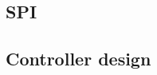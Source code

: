 \documentclass[../../main]{subfiles}
\begin{document}
\subsection{SPI}%
\label{sub:spi}



\subsection{Controller design}%
\label{sec:controller_design}

\end{document}
